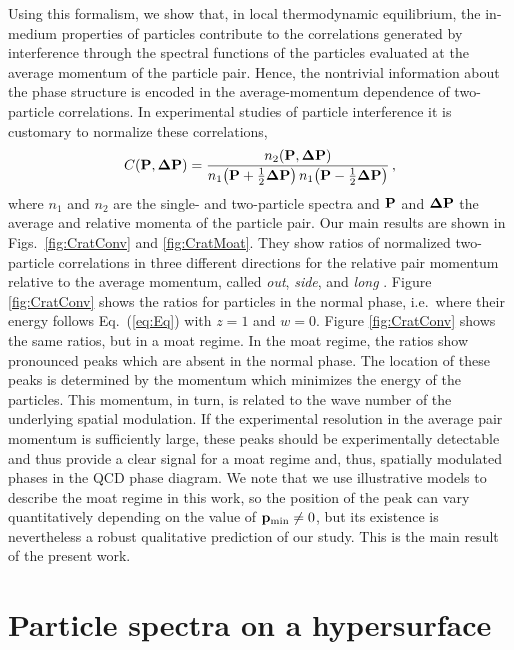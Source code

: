 \documentclass[reprint,superscriptaddress,english,preprintnumbers,amsmath,amssymb,aps,prx]{revtex4-2}
\def\Eq#1{Eq.~(\ref{#1})}
\begin{document}
Using this formalism, we show that, in local thermodynamic equilibrium, the in-medium properties of particles contribute to the correlations generated by interference through the spectral functions of the particles evaluated at the average momentum of the particle pair. Hence, the nontrivial information about the phase structure is encoded in the average-momentum dependence of two-particle correlations.
In experimental studies of particle interference it is customary to normalize these correlations,
\begin{align}\label{eq:C}
C(\bold{P},\bold{\Delta P}) = \frac{n_2(\bold{P},\bold{\Delta P})}{n_1\big(\bold{P}+\frac{1}{2}\bold{\Delta P}\big)\, n_1\big(\bold{P}-\frac{1}{2}\bold{\Delta P}\big)}\,,
\end{align}
where $n_1$ and $n_2$ are the single- and two-particle spectra and $\bold{P}$ and $\bold{\Delta P}$ the average and relative momenta of the particle pair.
Our main results are shown in Figs.\ \ref{fig:CratConv} and \ref{fig:CratMoat}. They show ratios of normalized two-particle correlations in three different directions for the relative pair momentum relative to the average momentum, called \emph{out}, \emph{side}, and \emph{long} \cite{Pratt:1984su, Pratt:1986cc}. Figure \ref{fig:CratConv} shows the ratios for particles in the normal phase, i.e.\ where their energy follows \Eq{eq:Eq} with $z=1$ and $w=0$. Figure \ref{fig:CratConv} shows the same ratios, but in a moat regime.
In the moat regime, the ratios show pronounced peaks which are absent in the normal phase.
The location of these peaks is determined by the momentum which minimizes the energy of the particles. This momentum, in turn, is related to the wave number of the underlying spatial modulation. 
If the experimental resolution in the average pair momentum is sufficiently large, these peaks should be experimentally detectable and thus provide a clear signal for a moat regime and, thus, spatially modulated phases in the QCD phase diagram. We note that we use illustrative models to describe the moat regime in this work, so the position of the peak can vary quantitatively depending on
the value of $\bold{p}_{\rm min} \neq 0$, but its existence is nevertheless a robust qualitative prediction of our study. This is the main result of the present work. 


\section{Particle spectra on a hypersurface}\label{sec:psh}
\end{document}
